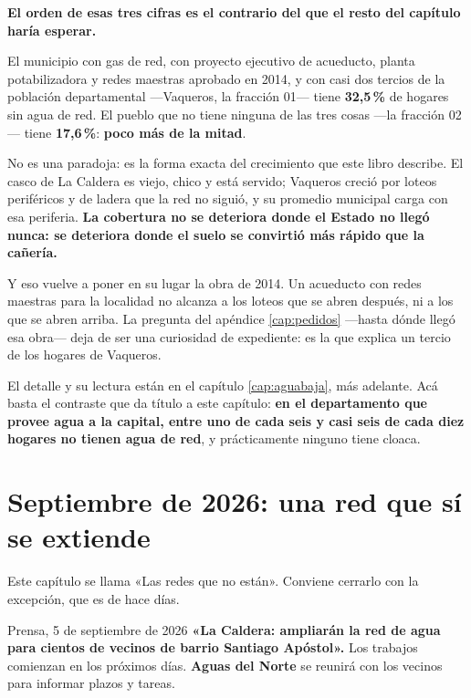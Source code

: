 \begin{cautela}
\textbf{El orden de esas tres cifras es el contrario del que el resto del capítulo haría esperar.}

El municipio con gas de red, con proyecto ejecutivo de acueducto, planta potabilizadora y redes maestras aprobado en 2014, y con casi dos tercios de la población departamental ---Vaqueros, la fracción 01--- tiene \textbf{32,5\,\%} de hogares sin agua de red. El pueblo que no tiene ninguna de las tres cosas ---la fracción 02--- tiene \textbf{17,6\,\%}: \textbf{poco más de la mitad}.

No es una paradoja: es la forma exacta del crecimiento que este libro describe. El casco de La Caldera es viejo, chico y está servido; Vaqueros creció por loteos periféricos y de ladera que la red no siguió, y su promedio municipal carga con esa periferia. \textbf{La cobertura no se deteriora donde el Estado no llegó nunca: se deteriora donde el suelo se convirtió más rápido que la cañería.}

Y eso vuelve a poner en su lugar la obra de 2014. Un acueducto con redes maestras para la localidad no alcanza a los loteos que se abren después, ni a los que se abren arriba. La pregunta del apéndice \ref{cap:pedidos} ---hasta dónde llegó esa obra--- deja de ser una curiosidad de expediente: es la que explica un tercio de los hogares de Vaqueros.
\end{cautela}

El detalle y su lectura están en el capítulo \ref{cap:aguabaja}, más adelante. Acá basta el contraste que da título a este capítulo: \textbf{en el departamento que provee agua a la capital, entre uno de cada seis y casi seis de cada diez hogares no tienen agua de red}, y prácticamente ninguno tiene cloaca.

\section{Septiembre de 2026: una red que sí se extiende}

Este capítulo se llama «Las redes que no están». Conviene cerrarlo con la excepción, que es de
hace días.

\begin{ficha}{Prensa, 5 de septiembre de 2026}
\textbf{«La Caldera: ampliarán la red de agua para cientos de vecinos de barrio Santiago
Apóstol».} Los trabajos comienzan en los próximos días. \textbf{Aguas del Norte} se reunirá con
los vecinos para informar plazos y tareas.
\end{ficha}

